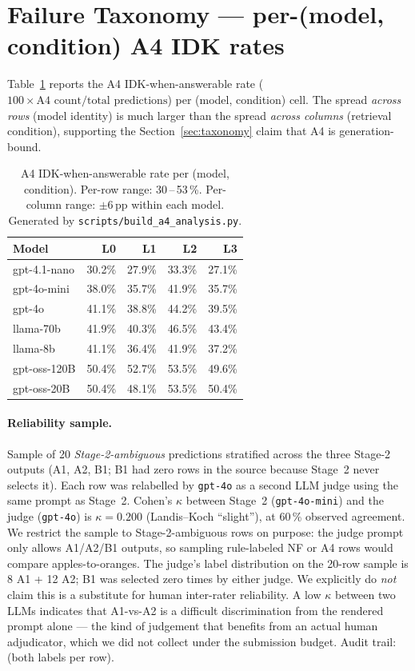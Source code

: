 \documentclass[11pt]{article}
\begin{document}
\section{Failure Taxonomy --- per-(model, condition) A4 IDK rates}
\label{app:tax}
Table~\ref{tab:a4-rate} reports the A4 IDK-when-answerable rate
($100 \times \text{A4 count} / \text{total predictions}$) per
(model, condition) cell. The spread \emph{across rows} (model identity)
is much larger than the spread \emph{across columns} (retrieval
condition), supporting the Section~\ref{sec:taxonomy} claim that A4 is
generation-bound.

\begin{table}[h]
\centering
\small
\begin{tabular}{lrrrr}
\toprule
Model        & L0 & L1 & L2 & L3 \\
\midrule
gpt-4.1-nano & 30.2\% & 27.9\% & 33.3\% & 27.1\% \\
gpt-4o-mini  & 38.0\% & 35.7\% & 41.9\% & 35.7\% \\
gpt-4o       & 41.1\% & 38.8\% & 44.2\% & 39.5\% \\
llama-70b    & 41.9\% & 40.3\% & 46.5\% & 43.4\% \\
llama-8b     & 41.1\% & 36.4\% & 41.9\% & 37.2\% \\
gpt-oss-120B & 50.4\% & 52.7\% & 53.5\% & 49.6\% \\
gpt-oss-20B  & 50.4\% & 48.1\% & 53.5\% & 50.4\% \\
\bottomrule
\end{tabular}
\caption{A4 IDK-when-answerable rate per (model, condition).
Per-row range: 30\,--\,53\,\%. Per-column range: $\pm 6\,\text{pp}$
within each model. Generated by
\texttt{scripts/build\_a4\_analysis.py}.}
\label{tab:a4-rate}
\end{table}

\paragraph{Reliability sample.}
Sample of 20 \emph{Stage-2-ambiguous} predictions stratified across
the three Stage-2 outputs (A1, A2, B1; B1 had zero rows in the source
because Stage~2 never selects it). Each row was relabelled by
\texttt{gpt-4o} as a second LLM judge using the same prompt as
Stage~2. Cohen's $\kappa$ between Stage~2 (\texttt{gpt-4o-mini}) and
the judge (\texttt{gpt-4o}) is $\kappa = 0.200$ (Landis--Koch
``slight''), at 60\,\% observed agreement.
We restrict the sample to Stage-2-ambiguous rows on purpose: the
judge prompt only allows A1/A2/B1 outputs, so sampling rule-labeled
NF or A4 rows would compare apples-to-oranges. The judge's label
distribution on the 20-row sample is 8 A1 + 12 A2; B1 was selected
zero times by either judge.
We explicitly do \emph{not} claim this is a substitute for human
inter-rater reliability. A low $\kappa$ between two LLMs indicates
that A1-vs-A2 is a difficult discrimination from the rendered prompt
alone --- the kind of judgement that benefits from an actual human
adjudicator, which we did not collect under the submission budget.
Audit trail: 
(both labels per row).
\end{document}
